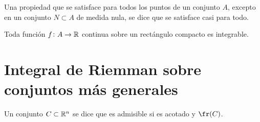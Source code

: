 \begin{defi}
	Una propiedad que se satisface para todos los puntos de un conjunto $A$,
	excepto en un conjunto $N \subset A$ de medida nula, se dice que se satisface
	casi para todo.
\end{defi}

\begin{prop}
	Toda función $f \colon A \to \mathbb{R}$ continua sobre un rectángulo compacto es
	integrable.
\end{prop}

\section{Integral de Riemman sobre conjuntos más generales}

 \begin{defi}
  Un conjunto $C \subset \mathbb{R}^n$ se dice que es admisible si es acotado y $\fr(C)$.
 \end{defi}
 
 

